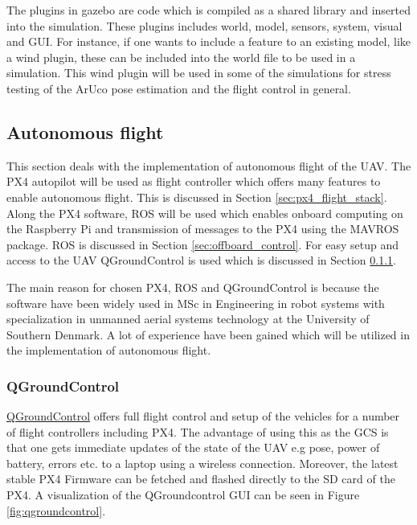 \documentclass[../Head/report.tex]{subfiles}
\begin{document}
The plugins in gazebo are code which is compiled as a shared library and inserted into the simulation. These plugins includes world, model, sensors, system, visual and GUI. For instance, if one wants to include a feature to an existing model, like a wind plugin, these can be included into the world file to be used in a simulation. This wind plugin will be used in some of the simulations for stress testing of the ArUco pose estimation and the flight control in general.

\subsection{Autonomous flight}
\label{sec:autonomous_flight}

This section deals with the implementation of autonomous flight of the UAV. The PX4 autopilot will be used as flight controller which offers many features to enable autonomous flight. This is discussed in Section \ref{sec:px4_flight_stack}. Along the PX4 software, ROS will be used which enables onboard computing on the Raspberry Pi and transmission of messages to the PX4 using the MAVROS package. ROS is discussed in Section \ref{sec:offboard_control}. For easy setup and access to the UAV QGroundControl is used which is discussed in Section \ref{sec:qgroundcontrol}. 

The main reason for chosen PX4, ROS and QGroundControl is because the software have been widely used in MSc in Engineering in robot systems with
specialization in unmanned aerial systems technology at the University of Southern Denmark. A lot of experience have been gained which will be utilized in the implementation of autonomous flight.

\subsubsection{QGroundControl}
\label{sec:qgroundcontrol}

\href{https://docs.qgroundcontrol.com/master/en/}{QGroundControl} offers full flight control and setup of the vehicles for a number of flight controllers including PX4. The advantage of using this as the GCS is that one gets immediate updates of the state of the UAV e.g pose, power of battery, errors etc. to a laptop using a wireless connection.  Moreover, the latest stable PX4 Firmware can be fetched and flashed directly to the SD card of the PX4. A visualization of the QGroundcontrol GUI can be seen in Figure \ref{fig:qgroundcontrol}.
\end{document}
